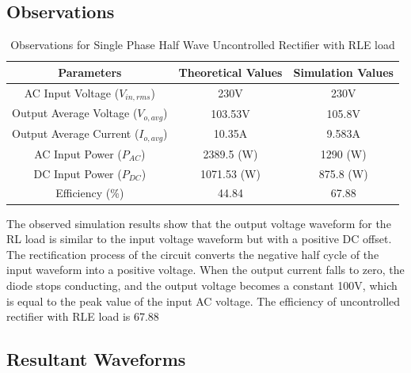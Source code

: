 \subsection{Observations}

\begin{table}[h]
    \renewcommand{\arraystretch}{1.3}

    \label{table_observation_4}
    \centering
    \begin{tabular}{|c|c|c|}
        \hline
        Parameters                              & Theoretical Values & Simulation Values \\
        \hline
        \hline
        AC Input Voltage ($ V_{in,rms} $)       & 230V               & 230V              \\
        \hline
        Output Average Voltage ($ V_{o,avg} $)  & 103.53V            & 105.8V            \\
        \hline
        Output Average Current ($ I_{o,avg}  $) & 10.35A             & 9.583A            \\
        \hline
        AC Input Power ($ P_{AC}  $)            & 2389.5 (W)         & 1290 (W)          \\
        \hline
        DC Input Power ($ P_{DC}  $)            & 1071.53 (W)        & 875.8 (W)         \\
        \hline
        Efficiency (\%)                         & 44.84              & 67.88             \\
        \hline
    \end{tabular}
    \caption{Observations for Single Phase Half Wave Uncontrolled Rectifier with RLE load}
\end{table}


The observed simulation results show that the output voltage waveform for the RL load is similar to the input voltage waveform but with a positive DC offset. The rectification process of the circuit converts the negative half cycle of the input waveform into a positive voltage. When the output current falls to zero, the diode stops conducting, and the output voltage becomes a constant 100V, which is equal to the peak value of the input AC voltage.
The efficiency of uncontrolled rectifier with RLE load is 67.88%

\pagebreak

\subsection{Resultant Waveforms}

